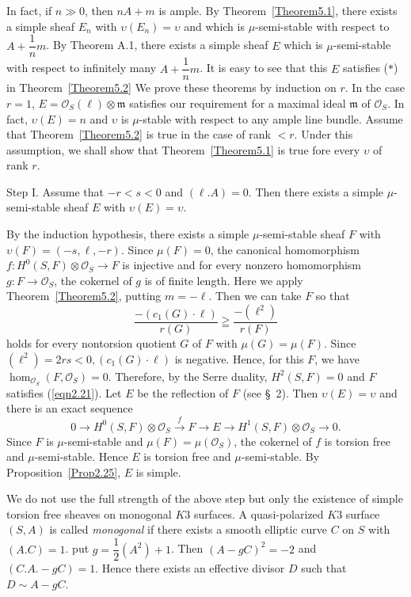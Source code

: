 In fact, if $n\gg 0$, then $nA+m$ is ample. By
Theorem~\ref{Theorem5.1}, there exists a simple sheaf $E_n$ with
$\upsilon(E_n)=\upsilon$ and which is $\mu$-semi-stable with respect
to $A+\dfrac{1}{n}m$. By Theorem A.1, there exists a simple sheaf $E$
which is $\mu$-semi-stable with respect to infinitely many
$A+\dfrac{1}{n}m$. It is easy to see that this $E$ satisfies ($\ast$)
in Theorem~\ref{Theorem5.2} We prove these theorems by induction on
$r$. In the case $r=1$, $E=\mathscr{O}_S(\ell)\otimes \mathfrak{m}$
satisfies our requirement for a maximal ideal $\mathfrak{m}$ of
$\mathscr{O}_S$. In fact, $\upsilon(E)=n$ and $\upsilon$ is $\mu$-stable with
respect to any ample line bundle. Assume that Theorem~\ref{Theorem5.2}
is true in the case of rank $<r$. Under this assumption, we shall show
that Theorem~\ref{Theorem5.1} is true fore every $\upsilon$ of rank
$r$.

Step I. Assume that $-r<s<0$ and $(\ell.A)=0$. Then there exists a
simple $\mu$-semi-stable sheaf $E$ with $\upsilon(E)=\upsilon$. 

\begin{Proof}\pageoriginale
By the induction hypothesis, there exists a simple $\mu$-semi-stable
sheaf $F$ with $\upsilon(F)=(-s,\ell,-r)$. Since $\mu(F)=0$, the
canonical homomorphism $f:H^{0}(S,F)\otimes \mathscr{O}_S\to F$ is
injective and for every nonzero homomorphism $g:F\to \mathscr{O}_S$,
the cokernel of $g$ is of finite length. Here we apply
Theorem~\ref{Theorem5.2}, putting $m=-\ell$. Then we can take $F$ so
that 
$$
\dfrac{-(c_1(G)\cdot \ell)}{r(G)}\geqq\dfrac{-(\ell^{2})}{r(F)}
$$
holds for every nontorsion quotient $G$ of $F$ with
$\mu(G)=\mu(F)$. Since $(\ell^{2})=2rs<0,(c_1(G)\cdot \ell)$ is
negative. Hence, for this $F$, we have
$\hom_{\mathscr{O}_S}(F,\mathscr{O}_S)=0$. Therefore, by the Serre
duality, $H^{2}(S,F)=0$ and $F$ satisfies (\ref{eqn2.21}). Let $E$ be
the reflection of $F$ (see \S\ 2). Then $\upsilon(E)=\upsilon$ and
there is an exact sequence
$$
0\to H^{0}(S,F)\otimes \mathscr{O}_S\xrightarrow{f} F\to E\to
H^{1}(S,F)\otimes \mathscr{O}_S\to 0.
$$
Since $F$ is $\mu$-semi-stable and $\mu(F)=\mu(\mathscr{O}_S)$, the
cokernel of $f$ is torsion free and $\mu$-semi-stable. Hence $E$ is
torsion free and $\mu$-semi-stable. By Proposition~\ref{Prop2.25}, $E$
is simple.
\enprf
\end{Proof}

We do not use the full strength of the above step but only the
existence of simple torsion free sheaves on monogonal $K3$ surfaces. A
quasi-polarized $K3$ surface $(S,A)$ is called \textit{monogonal} if
there exists a smooth elliptic curve $C$ on $S$ with $(A.C)=1$.  put
$g=\dfrac{1}{2}\left(A^{2}\right)+1$. Then $(A-gC)^{2}=-2$ and
$(C.A.-gC)=1$. Hence there exists an effective divisor $D$ such that
$D\sim A-gC$.  

